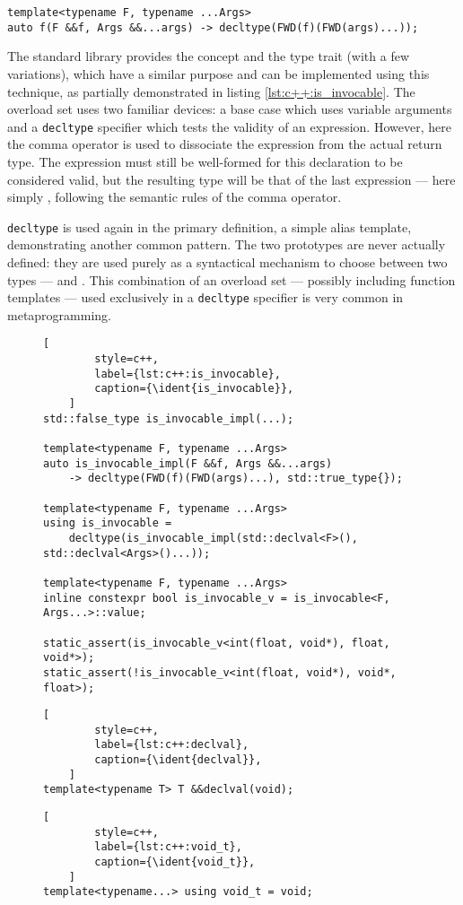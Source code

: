 \begin{lstlisting}[style=c++]
template<typename F, typename ...Args>
auto f(F &&f, Args &&...args) -> decltype(FWD(f)(FWD(args)...));
\end{lstlisting}

The standard library provides the  concept and the
 type trait (with a few variations), which have a
similar purpose and can be implemented using this technique, as partially
demonstrated in listing \ref{lst:c++:is_invocable}.  The
 overload set uses two familiar devices: a base case
which uses variable arguments and a \texttt{decltype} specifier which tests the
validity of an expression.  However, here the comma operator is used to
dissociate the expression from the actual return type.  The expression must
still be well-formed for this declaration to be considered valid, but the
resulting type will be that of the last expression --- here simply
, following the semantic rules of the comma operator.

\texttt{decltype} is used again in the primary definition, a simple alias
template, demonstrating another common pattern.  The two
 prototypes are never actually defined: they are used
purely as a syntactical mechanism to choose between two types ---
 and .  This combination of an
overload set --- possibly including function templates --- used exclusively in a
\texttt{decltype} specifier is very common in metaprogramming.

\begin{figure}[ht]
    \begin{lstlisting}[
        style=c++,
        label={lst:c++:is_invocable},
        caption={\ident{is_invocable}},
    ]
std::false_type is_invocable_impl(...);

template<typename F, typename ...Args>
auto is_invocable_impl(F &&f, Args &&...args)
    -> decltype(FWD(f)(FWD(args)...), std::true_type{});

template<typename F, typename ...Args>
using is_invocable =
    decltype(is_invocable_impl(std::declval<F>(), std::declval<Args>()...));

template<typename F, typename ...Args>
inline constexpr bool is_invocable_v = is_invocable<F, Args...>::value;

static_assert(is_invocable_v<int(float, void*), float, void*>);
static_assert(!is_invocable_v<int(float, void*), void*, float>);
    \end{lstlisting}
    \begin{lstlisting}[
        style=c++,
        label={lst:c++:declval},
        caption={\ident{declval}},
    ]
template<typename T> T &&declval(void);
    \end{lstlisting}
    \begin{lstlisting}[
        style=c++,
        label={lst:c++:void_t},
        caption={\ident{void_t}},
    ]
template<typename...> using void_t = void;
    \end{lstlisting}
\end{figure}

